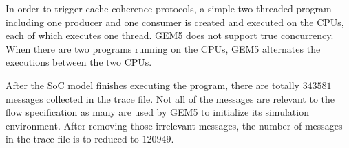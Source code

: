 \documentclass[conference]{IEEEtran}
\begin{document}

In order to trigger cache coherence protocols, a simple two-threaded program including one producer and one consumer is created and executed on the CPUs, each of which executes one thread.    GEM5 does not support true concurrency.  When there are two programs running on the CPUs, GEM5 alternates the executions between the two  CPUs.  


After the SoC model finishes executing the program, there are totally $343581$ messages collected in the trace file.  Not all of the messages are relevant to the flow specification as many are used by GEM5 to initialize its simulation environment.  After removing those irrelevant messages, the number of messages in the trace file is to reduced to $120949$. 
\end{document}
